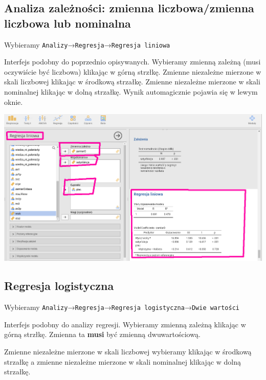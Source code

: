 \documentclass[
  openany]{book}
\begin{document}
\hypertarget{analiza-zaleux17cnoux15bci-zmienna-liczbowazmienna-liczbowa-lub-nominalna}{%
\subsection{Analiza zależności: zmienna liczbowa/zmienna liczbowa lub nominalna}\label{analiza-zaleux17cnoux15bci-zmienna-liczbowazmienna-liczbowa-lub-nominalna}}

Wybieramy \texttt{Analizy}→\texttt{Regresja}→\texttt{Regresja\ liniowa}

Interfejs podobny do poprzednio opisywanych. Wybieramy
zmienną zależną (musi oczywiście być liczbowa) klikając w górną strzłkę.
Zmienne niezależne mierzone w skali liczbowej
klikając w środkową strzałkę. Zmienne niezależne mierzone
w skali nominalnej klikając w dolną strzałkę.
Wynik automagicznie pojawia się w lewym oknie.

\includegraphics{./regresja_liniowa.png}

\hypertarget{regresja-logistyczna}{%
\subsection{Regresja logistyczna}\label{regresja-logistyczna}}

Wybieramy \texttt{Analizy}→\texttt{Regresja}→\texttt{Regresja\ logistyczna}→\texttt{Dwie\ wartości}

Interfejs podobny do analizy regresji. Wybieramy
zmienną zależną klikając w górną strzłkę. Zmienna ta
\textbf{musi} być zmienną dwuwartościową.

Zmienne niezależne mierzone w skali liczbowej
wybieramy klikając w środkową strzałkę a zmienne niezależne mierzone
w skali nominalnej klikając w dolną strzałkę.
\end{document}
